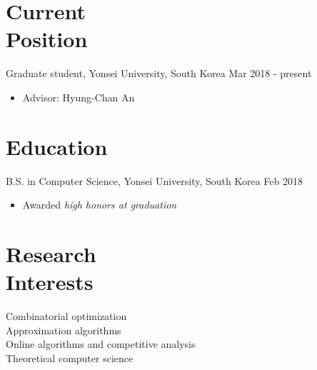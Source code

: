 \documentclass[margin, 10pt]{res} %
\begin{document}
\begin{resume}


\section{Current \\ Position}
Graduate student, Yonsei University, South Korea \hfill Mar 2018 - present
\begin{itemize} \itemsep -2pt %
\item[] Advisor: Hyung-Chan An
\end{itemize}


\section{Education}
B.S. in Computer Science, Yonsei University, South Korea \hfill Feb 2018
\begin{itemize} \itemsep -2pt %
\item[] Awarded \textsl{high honors at graduation}
\end{itemize}


\section{Research \\ Interests}
Combinatorial optimization\\
Approximation algorithms\\
Online algorithms and competitive analysis\\
Theoretical computer science


\end{resume}
\end{document}
